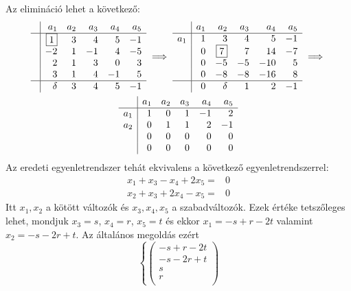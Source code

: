 \documentclass[9pt, showtrims]{memoir}
\theoremstyle{plain}
\theoremstyle{remark}
\theoremstyle{definition}
\begin{document}
\begin{enumerate}
\[    \]
    Az elimináció lehet a következő:
    \begin{multline*}
        \begin{array}{r|rrrrr}
            &a_1&a_2&a_3&a_4&a_5\\
            \hline
            &\boxed{1}&3&4&5&-1\\
            &-2&1&-1&4&-5\\
            &2&1&3&0&3\\
            &3&1&4&-1&5\\
            \hline
            &\delta&3&4&5&-1
        \end{array}
        \implies
        \begin{array}{r|rrrrr}
            &a_1&a_2&a_3&a_4&a_5\\
            \hline
            a_1&1&3&4&5&-1\\
            &0&\boxed{7}&7&14&-7\\
            &0&-5&-5&-10&5\\
            &0&-8&-8&-16&8\\
            \hline
            &0&\delta&1&2&-1
        \end{array}
        \implies
        \\
        \begin{array}{r|rrrrr}
            &a_1&a_2&a_3&a_4&a_5\\
            \hline
            a_1&1&0&1&-1&2\\
            a_2&0&1&1&2&-1\\
            &0&0&0&0&0\\
            &0&0&0&0&0
        \end{array}
    \end{multline*}
Az eredeti egyenletrendszer tehát ekvivalens a következő egyenletrendszerrel:
\[
    \begin{array}{rl}
        x_1+x_3-x_4+2x_5=&0\\
        x_2+x_3+2x_4-x_5=&0
    \end{array}
\]
Itt $x_1,x_2$ a kötött változók és $x_3,x_4,x_5$ a szabadváltozók.
Ezek értéke tetszőleges lehet, mondjuk $x_3=s$, $x_4=r$, $x_5=t$ és ekkor 
$x_1=-s+r-2t$ valamint $x_2=-s-2r+t$.
Az általános megoldás ezért
\[
    \left\{ 
        \begin{pmatrix}
            -s+r-2t\\
            -s-2r+t\\
            s\\
            r\\

\end{pmatrix}\]
\end{enumerate}
\end{document}
